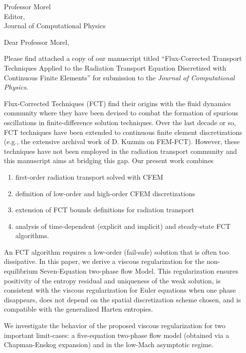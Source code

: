 \begin{letter}{Professor Morel\\
    Editor,\\
    Journal of Computational Physics}
\date{\today}

\opening{Dear Professor Morel,}
         \vspace{0.25cm}

Please find attached a copy of our manuscript titled ``Flux-Corrected Transport Techniques Applied to the Radiation Transport Equation Discretized with Continuous Finite Elements'' for submission to the {\em Journal of Computational Physics}. 

Flux-Corrected Techniques (FCT) find their origins with the fluid dynamics community where they have been devised to combat the formation of spurious oscillations in finite-difference solution techniques. Over the last decade or so, FCT techniques have been extended to continuous finite element discretizations (e.g., the extensive archival work of D. Kuzmin on FEM-FCT). However, these techniques have not been employed in the radiation transport community and this manuscript aims at bridging this gap. Our present work combines 
\begin{enumerate}
\item first-order radiation transport solved with CFEM
\item definition of low-order and high-order CFEM discretizations
\item extension of FCT bounds definitions for radiation transport
\item analysis of time-dependent (explicit and implicit) and steady-state FCT algorithms.
\end{enumerate}
%
An FCT algorithm requires a low-order (fail-safe) solution that is often too dissipative. 
In this paper, we derive a viscous regularization for the non-equilibrium Seven-Equation two-phase flow Model. This regularization ensures positivity of the entropy 
residual and uniqueness of the weak solution, is consistent with the viscous regularization for Euler equations when one phase disappears, does not depend on the spatial discretization scheme chosen, and is compatible with the generalized Harten entropies. 

We investigate the behavior of the proposed viscous regularization for two important limit-cases: a five-equation two-phase flow model (obtained via a Chapman-Enskog expansion) and in the low-Mach asymptotic regime.



\end{letter}
